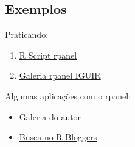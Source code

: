 

\subsection{Exemplos}

\begin{frame}
 Praticando:
  \begin{enumerate}
  \item
    \href{run:./R/rpanel/rpanel.R}{R Script rpanel}
  \item 
    \href{run:rpanel.html}{Galeria rpanel IGUIR}
  \end{enumerate}

  \vspace{0.5cm}
  Algumas aplicações com o rpanel:
  \begin{itemize}
  \item \href{http://www.stats.gla.ac.uk/~adrian/rpanel/}{Galeria
      do autor}
  \item \href{http://www.r-bloggers.com/?s=rpanel}{Busca no R
      Bloggers}
  \end{itemize}

\end{frame}

